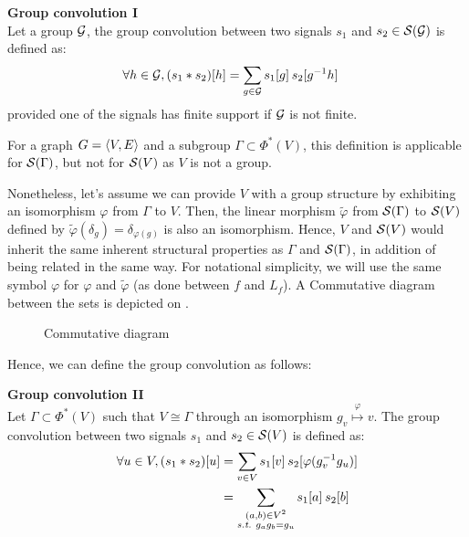 \begin{definition}\textbf{Group convolution I}\\
Let a group $\group$, the group convolution between two signals $s_1$ and $s_2 \in \cs(\group)$ is defined as:
\begin{align*}
\forall h \in \group, (s_1 \ast s_2)[h] & = \displaystyle \sum_{g \in \group} s_1[g] \h{2} s_2[g^{-1}h]%
\end{align*}
provided one of the signals has finite support if $\group$ is not finite.
\label{def:conv1}
\end{definition}

For a graph $\gve$ and a subgroup $\Gamma \subset \Phi^*(V)$, this definition is applicable for $\cs(\Gamma)$, but not for $\cs(V)$ as $V$ is not a group.

Nonetheless, let's assume we can provide $V$ with a group structure by exhibiting an isomorphism $\varphi$ from $\Gamma$ to $V$. Then, the linear morphism $\widetilde\varphi$ from $\cs(\Gamma)$ to $\cs(V)$ defined by $\widetilde\varphi(\delta_g) = \delta_{\varphi(g)}$ is also an isomorphism. Hence, $V$ and $\cs(V)$ would inherit the same inherent structural properties as $\Gamma$ and $\cs(\Gamma)$, in addition of being related in the same way. For notational simplicity, we will use the same symbol $\varphi$ for $\varphi$ and $\widetilde\varphi$ (as done between $f$ and $L_f$). A Commutative diagram between the sets is depicted on .

\begin{figure}[H]
\centering
{}%
\caption{Commutative diagram}
\label{fig:iso}
\end{figure}

Hence, we can define the group convolution as follows:

\begin{definition}\textbf{Group convolution II}\\
Let $\Gamma \subset \Phi^*(V)$ such that $V \cong \Gamma$ through an isomorphism $g_v \overset{\varphi}\mapsto v$.
The group convolution between two signals $s_1$ and $s_2 \in \cs(V)$ is defined as:
\begin{align*}
\forall u \in V, (s_1 \ast s_2) [u] & = \displaystyle \sum_{v \in V} s_1[v] \h{2} s_2[\varphi(g_v^{-1}g_u)]\\
& = \displaystyle \sum_{\substack{(a,b) \in V^2 \\ \st g_ag_b=g_u }} s_1[a] \h{2} s_2[b]
\end{align*}
\label{def:conv2}
\end{definition}

